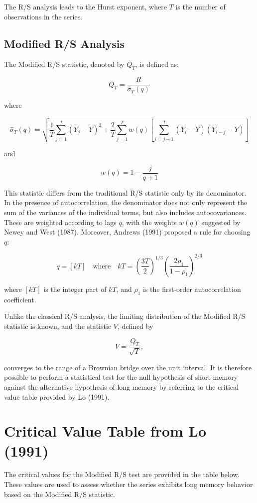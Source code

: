 \documentclass[11pt]{extarticle}
\begin{document}
The R/S analysis leads to the Hurst exponent, where $T$ is the number of observations in the series.

\subsection{Modified R/S Analysis}
The Modified R/S statistic, denoted by $Q_T$, is defined as:

\[
Q_T = \frac{R}{\hat{\sigma}_T(q)}
\]

where

\[
\hat{\sigma}_T(q) = \sqrt{\frac{1}{T} \sum_{j=1}^{T} (Y_j - \bar{Y})^2 + \frac{2}{T} \sum_{j=1}^{T} w(q) \left[ \sum_{i=j+1}^{T} (Y_i - \bar{Y})(Y_{i-j} - \bar{Y}) \right]}
\]

and

\[
w(q) = 1 - \frac{j}{q+1}
\]

This statistic differs from the traditional R/S statistic only by its denominator. In the presence of autocorrelation, the denominator does not only represent the sum of the variances of the individual terms, but also includes autocovariances.
These are weighted according to lags $q$, with the weights $w(q)$ suggested by Newey and West (1987). Moreover, Andrews (1991) proposed a rule for choosing $q$:

\[
q = \left[ kT \right] \quad \text{where} \quad kT = \left( \frac{3T}{2} \right)^{1/3} \left( \frac{2 \rho_1}{1 - \rho_1} \right)^{2/3}
\]

where $[kT]$ is the integer part of $kT$, and $\rho_1$ is the first-order autocorrelation coefficient.

Unlike the classical R/S analysis, the limiting distribution of the Modified R/S statistic is known, and the statistic $V$, defined by

\[
V = \frac{Q_T}{\sqrt{T}},
\]

converges to the range of a Brownian bridge over the unit interval. It is therefore possible to perform a statistical test for the null hypothesis of short memory against the alternative hypothesis of long memory by referring to the critical value table provided by Lo (1991).

\section*{Critical Value Table from Lo (1991)}
The critical values for the Modified R/S test are provided in the table below. These values are used to assess whether the series exhibits long memory behavior based on the Modified R/S statistic.
\end{document}
